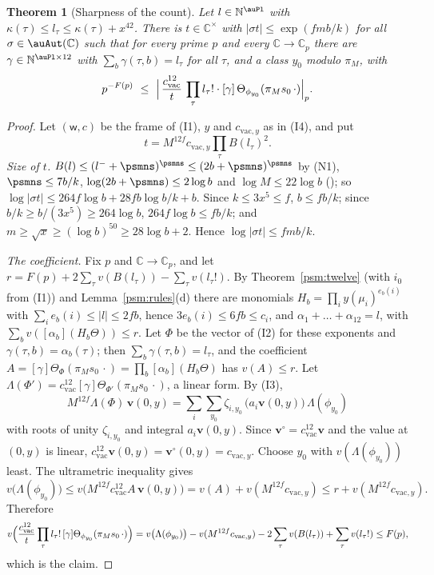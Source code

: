\documentclass[10pt]{amsart}
\newtheorem{theorem}{Theorem}[section]
\theoremstyle{definition}
\theoremstyle{remark}
\newcommand{\C}{\mathbb C}
\newcommand{\N}{\mathbb N}
\providecommand{\psvac}{\mathbf v}
\begin{document}
\begin{theorem}[Sharpness of the count]\label{psm:attained}
Let $l\in\N^{\auPl}$ with $\kappa(\tau)\le l_\tau\le\kappa(\tau)+x^{42}$.
There is $t\in\C^\times$ with $|\sigma t|\le\exp(fmb/k)$ for all $\sigma\in\auAut(\C)$ such that
for every prime $p$ and every $\C\to\C_p$ there are $\gamma\in\N^{\auPl\times12}$ with
$\sum_b\gamma(\tau,b)=l_\tau$ for all $\tau$, and a class $y_0$ modulo $\pi_M$, with
\[
p^{-F(p)}\ \le\ \Bigl|\,\frac{c_{\mathrm{vac}}^{12}}t\,\prod_\tau l_\tau!\cdot[\gamma]\,
\Theta_{\phi_{y_0}}(\pi_Ms_0\,\cdot)\Bigr|_p .
\]
\end{theorem}
\begin{proof}
Let $(\mathsf w,c)$ be the frame of (I1), $y$ and $c_{\mathrm{vac},y}$ as in (I4), and put
\[
t=M^{12f}c_{\mathrm{vac},y}\prod_\tau B(l_\tau)^2 .
\]
\emph{Size of $t$.} $B(l)\le(l^-+\psmns)^{\psmns}\le(2b+\psmns)^{\psmns}$ by (N1), $\psmns\le
7b/k$, $\log(2b+\psmns)\le2\log b$ and $\log M\le22\log b$ ({\cite[Lemma~13.4(S5)]{P46}}); so
$\log|\sigma t|\le264f\log b+28fb\log b/k+b$. Since $k\le3x^5\le f$, $b\le fb/k$; since
$b/k\ge b/(3x^5)\ge264\log b$, $264f\log b\le fb/k$; and $m\ge\sqrt x\ge(\log b)^{50}\ge
28\log b+2$. Hence $\log|\sigma t|\le fmb/k$.

\emph{The coefficient.} Fix $p$ and $\C\to\C_p$, and let $r=F(p)+2\sum_\tau v(B(l_\tau))-
\sum_\tau v(l_\tau!)$. By Theorem~\ref{psm:twelve} (with $i_0$ from (I1)) and
Lemma~\ref{psm:rules}(d) there are monomials $H_b=\prod_iy(\mu_i)^{e_b(i)}$ with $\sum_ie_b(i)\le
|l|\le2fb$, hence $3e_b(i)\le6fb\le c_i$, and $\alpha_1+\dots+\alpha_{12}=l$, with $\sum_bv([\alpha_b]
(H_b\Theta))\le r$. Let $\Phi$ be the vector of (I2) for these exponents and
$\gamma(\tau,b)=\alpha_b(\tau)$; then $\sum_b\gamma(\tau,b)=l_\tau$, and the coefficient
$A=[\gamma]\Theta_\Phi(\pi_Ms_0\,\cdot)=\prod_b[\alpha_b](H_b\Theta)$ has $v(A)\le r$. Let
$\Lambda(\Phi')=c_{\mathrm{vac}}^{12}[\gamma]\Theta_{\Phi'}(\pi_Ms_0\,\cdot)$, a linear form. By (I3),
\[
M^{12f}\Lambda(\Phi)\,\psvac(0,y)=\sum_i\sum_{y_0}\zeta_{i,y_0}\,\bigl(a_i\psvac(0,y)
\bigr)\,\Lambda(\phi_{y_0})
\]
with roots of unity $\zeta_{i,y_0}$ and integral $a_i\psvac(0,y)$. Since $\psvac^\circ=c_{\mathrm{vac}}^{12}\psvac$ and the value at $(0,y)$ is linear,
$c_{\mathrm{vac}}^{12}\psvac(0,y)=\psvac^\circ(0,y)=c_{\mathrm{vac},y}$. Choose $y_0$ with
$v(\Lambda(\phi_{y_0}))$ least. The ultrametric inequality gives
\[
v\bigl(\Lambda(\phi_{y_0})\bigr)\le v\bigl(M^{12f}c_{\mathrm{vac}}^{12}A\,\psvac(0,y)\bigr)=
v(A)+v(M^{12f}c_{\mathrm{vac},y})\le r+v(M^{12f}c_{\mathrm{vac},y}).
\]
Therefore
\[
v\Bigl(\frac{c_{\mathrm{vac}}^{12}}t\prod_\tau l_\tau!\,[\gamma]\Theta_{\phi_{y_0}}(\pi_Ms_0\,\cdot)
\Bigr)=v\bigl(\Lambda(\phi_{y_0})\bigr)-v(M^{12f}c_{\mathrm{vac},y})-2\sum_\tau v(B(l_\tau))+\sum_\tau v(l_\tau!)
\le F(p),
\]
which is the claim.
\end{proof}
\end{document}
